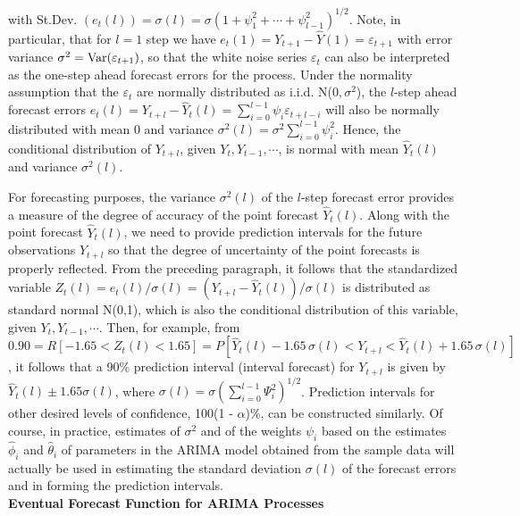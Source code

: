 with St.Dev. $(e_t(l)) = \sigma(l) = \sigma(1 + \psi_1^2 + \cdots + \psi_{l-1}^2)^{1/2}$. Note, in particular, that for $l = 1$ step we have $e_t(1) = Y_{t+1} - \hat{Y}(1) = \varepsilon_{t+1}$ with error variance $\sigma^2 = \operatorname{Var}(\varepsilon_{t+1})$, so that the white noise series $\varepsilon_t$ can also be interpreted as the one-step ahead forecast errors for the process. Under the normality assumption that the $\varepsilon_t$ are normally distributed as i.i.d. N($0, \sigma^2$), the $l$-step ahead forecast errors $e_t(l) = Y_{t+l} - \hat{Y}_t(l) = \sum_{i=0}^{l-1}\psi_i\varepsilon_{t+l-i}$ will also be normally distributed with mean 0 and variance $\sigma^2(l) = \sigma^2\sum_{i=0}^{l-1}\psi_i^2$. Hence, the conditional distribution of $Y_{t+l}$, given $Y_t,Y_{t-1},\cdots$, is normal with mean $\hat{Y}_t(l)$ and variance $\sigma^2(l)$.


For forecasting purposes, the variance $\sigma^2(l)$ of the $l$-step forecast error provides a measure of the degree of accuracy of the point forecast $\hat{Y}_t(l)$. Along with the point forecast $\hat{Y}_t(l)$, we need to provide prediction intervals for the future observations $Y_{t+l}$ so that the degree of uncertainty of the point forecasts is properly reflected. From the preceding paragraph, it follows that the standardized variable $Z_t(l) = e_t(l)/\sigma(l)= (Y_{t+l} - \hat{Y}_t(l))/\sigma(l)$ is distributed as standard normal N(0,1), which is also the conditional distribution of this variable, given $Y_t, Y_{t-1},\cdots$. Then, for example, from $0.90 = R[-1.65 < Z_t(l) < 1.65] = P[\hat{Y}_t(l) - 1.65\,\sigma(l) < Y_{t+l} < \hat{Y}_t(l) + 1.65\,\sigma(l)]$, it follows that a 90\% prediction interval (interval forecast) for $Y_{t+l}$ is given by $\hat{Y}_t(l) \pm 1.65\sigma(l)$, where $\sigma(l) = \sigma(\sum_{i=0}^{l-1}\Psi_i^2)^{1/2}$. Prediction intervals for other desired levels of confidence, 100(1 - $\alpha$)\%, can be constructed similarly. Of course, in practice, estimates of $\sigma^2$ and of the weights $\psi_i$ based on the estimates $\hat{\phi}_i$ and $\hat{\theta}_i$ of parameters in the ARIMA model obtained from the sample data will actually be used in estimating the standard deviation $\sigma(l)$ of the forecast errors and in forming the prediction intervals. \\


\noindent\textbf{Eventual Forecast Function for ARIMA Processes} \\


